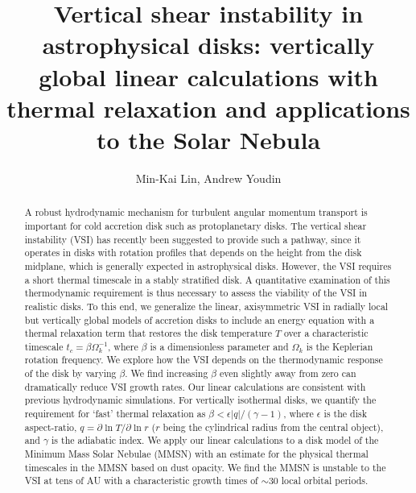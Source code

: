 \documentclass[iop]{emulateapj}
\newcommand{\p}{\partial}
\begin{document}
\title{Vertical shear instability in astrophysical disks: vertically global linear calculations with thermal relaxation and applications to the Solar Nebula} 
\author{Min-Kai Lin, Andrew Youdin}

\begin{abstract}
  A robust hydrodynamic mechanism for turbulent angular momentum
  transport is important for cold accretion disk such as 
  protoplanetary disks. The vertical shear instability (VSI) has 
  recently been suggested to provide such a pathway, since it operates in
  disks with rotation profiles that depends on the height from the
  disk  midplane, which is generally expected in  
  astrophysical disks. However, the VSI requires a short thermal
  timescale in a stably stratified disk. %
  A quantitative examination of this thermodynamic 
  requirement is thus necessary to assess the viability of
  the VSI in realistic disks. To this end,  
  we generalize the linear, axisymmetric VSI in radially local but
  vertically global models of accretion disks to include an energy
  equation with a thermal relaxation term that restores the disk
  temperature $T$ over a characteristic timescale
  $t_c=\beta\Omega_k^{-1}$, where $\beta$ is a dimensionless parameter
  and $\Omega_k$ is the Keplerian rotation frequency. We explore how
  the VSI depends on the thermodynamic response  of the disk by
  varying $\beta$. We find increasing $\beta$ even slightly away from
  zero can dramatically reduce VSI growth rates. %
  Our  linear calculations are consistent with previous hydrodynamic
  simulations. For vertically isothermal disks, we quantify the
  requirement for `fast' thermal relaxation as $\beta < \epsilon|q|/(\gamma-1)$, where
  $\epsilon$ is the disk aspect-ratio, $q = \p\ln T/\p\ln r$  ($r$
  being the cylindrical radius from the central object), and 
  $\gamma$ is the adiabatic index. We apply our linear calculations 
  to a disk model of the Minimum Mass Solar Nebulae (MMSN) with an 
  estimate for the physical thermal timescales 
  in the MMSN based on dust opacity. We find the MMSN is unstable to
  the VSI at tens of AU with a characteristic growth times of $\sim
  30$ local orbital periods.  
\end{abstract}
\end{document}
